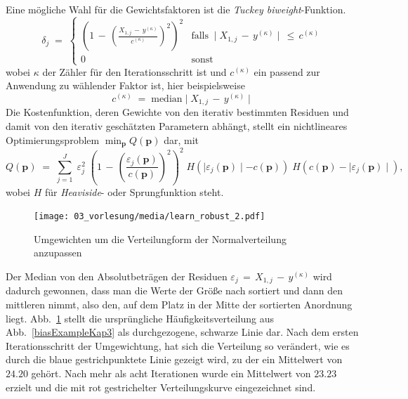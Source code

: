 Eine mögliche Wahl für die Gewichtsfaktoren ist die \textsl{Tuckey biweight}-Funktion.
\begin{equation}
\delta_j \; = \;
\left\{ \begin{array}{cl}
\left( 1 \, - \, \left( \frac{X_{1,j} \, - \, y^{(\kappa)}}{c^{(\kappa)}} \right)^2 \right)^2 & 
	\mathrm{falls} \; \mid X_{1,j} \, - \, y^{(\kappa)} \mid \, \leq \, c^{(\kappa)} \\
0 & \mathrm{sonst}
\end{array} \right.
\end{equation}
wobei $\kappa$ der Zähler für den Iterationsschritt ist und $c^{(\kappa)}$ ein passend zur Anwendung zu wählender Faktor ist, hier beispielsweise
\begin{equation}
c^{(\kappa)} \; = \; \mathrm{median} \mid X_{1,j} \, - \, y^{(\kappa)} \mid 
\end{equation}
Die Kostenfunktion, deren Gewichte von den iterativ bestimmten Residuen und damit von den
iterativ geschätzten Parametern abhängt, stellt ein nichtlineares Optimierungsproblem
$ \min_{\mathbf{p}} Q(\mathbf{p}) $ dar, mit
\begin{equation}
Q(\mathbf{p}) \; = \; \sum_{j=1}^J \; \varepsilon_j^2 \;
\left( 1 \, - \, \left( \frac{\varepsilon_j(\mathbf{p}) }{c(\mathbf{p})} \right)^2 \right)^2 \;
H(\mid \varepsilon_j(\mathbf{p}) \mid - c(\mathbf{p})) \;
H(c(\mathbf{p}) - \mid \varepsilon_j(\mathbf{p}) \mid ),
\label{robustEstim2}
\end{equation}
wobei $H$ für \textsl{Heaviside}- oder Sprungfunktion steht.

\begin{figure}
\begin{center}
\texttt{[image: 03\_vorlesung/media/learn\_robust\_2.pdf]}
\caption{\label{RobustIter} Umgewichten um die Verteilungform der Normalverteilung anzupassen}
\end{center}
\end{figure}

Der Median von den Absolutbeträgen der Residuen $\varepsilon_j \, = \, X_{1,j} \, - \, y^{(\kappa)}$ wird dadurch gewonnen,
dass man die Werte der Größe nach sortiert und dann den mittleren nimmt, also den, auf dem Platz in der Mitte der sortierten
Anordnung liegt.
Abb.~\ref{RobustIter} stellt die ursprüngliche Häufigkeitsverteilung aus Abb.~\ref{biasExampleKap3} als
durchgezogene, schwarze Linie dar. Nach dem ersten Iterationsschritt der Umgewichtung, hat sich die Verteilung so verändert,
wie es durch die blaue gestrichpunktete Linie gezeigt wird, zu der ein Mittelwert von $24.20$ gehört. Nach mehr als acht Iterationen
wurde ein Mittelwert von $23.23$ erzielt und die mit rot gestrichelter Verteilungskurve eingezeichnet sind.


